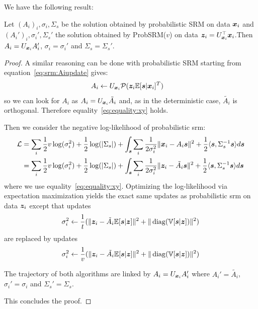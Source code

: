 We have the following result:
\begin{prop}
  Let $(A_i)_i, \sigma_i, \Sigma_s$ be the solution obtained by probabilistic SRM on data
  $\boldsymbol{x}_i$ and $(A_i')_i, \sigma_i', \Sigma_s'$ the solution obtained by ProbSRM($v$) on
  data $\boldsymbol{z}_i = U_{\boldsymbol{x}_i}^{\top} \boldsymbol{x}_i$.Then $A_i = U_{\boldsymbol{x}_i}A_i'$, $\sigma_i =
  \sigma_i'$ and $\Sigma_s = \Sigma_s'$. 
  \label{prop:optimalprobsrm}
\end{prop}
\begin{proof}
  A similar reasoning can be done with probabilistic SRM starting from
  equation~\eqref{eq:srm:Aiupdate} gives:
  \begin{align}
    A_i &\leftarrow U_{\boldsymbol{x}_i}\mathcal{P}(\boldsymbol{z}_i \mathbb{E}[\boldsymbol{s}| \boldsymbol{x}_i]^T)
  \end{align}
  so we can look for $A_i$ as $A_i = U_{\boldsymbol{x}_i} \tilde{A_i}$ and, as in the
  deterministic case, $\tilde{A_i}$ is orthogonal.
  Therefore equality~\eqref{eq:equality:xy} holds.
  
  Then we consider the negative log-likelihood of probabilistic srm:
  \begin{align}
    \mathcal{L} &= \sum_i \frac12 v\log(\sigma_i^2) + \frac12 \log(|\Sigma_s|) + \int_{\boldsymbol{s}} \sum_i \frac1{2 \sigma_i^{2}}\|\boldsymbol{x}_i - A_i \boldsymbol{s} \|^2 + \frac12 \langle \boldsymbol{s} , \Sigma_s^{-1} \boldsymbol{s} \rangle  d\boldsymbol{s} \\
    &= \sum_i \frac12 v \log(\sigma_i^2) + \frac12 \log(|\Sigma_s|) + \int_{\boldsymbol{s}} \sum_i \frac1{2 \sigma_i^{2}}\|\boldsymbol{z}_i - \tilde{A_i} \boldsymbol{s} \|^2 + \frac12 \langle \boldsymbol{s} , \Sigma_s^{-1} \boldsymbol{s} \rangle  d\boldsymbol{s}
  \end{align}
  where we use equality~\eqref{eq:equality:xy}.
  Optimizing the log-likelihood via expectation maximization yields the exact
  same updates as probabilistic srm on data $\boldsymbol{z}_i$
  except that updates
  \begin{align}
    \sigma_i^2 \leftarrow \frac1{t} (\| \boldsymbol{z}_i - \tilde{A_i} \mathbb{E}[\boldsymbol{s}|\boldsymbol{z}]\|^2 + \| \operatorname*{diag}(\mathbb{V}[\boldsymbol{s} | \boldsymbol{z}]) \|^2)
  \end{align}
  are replaced by updates
  \begin{align}
    \sigma_i^2 \leftarrow \frac1{v} (\| \boldsymbol{z}_i - \tilde{A_i} \mathbb{E}[\boldsymbol{s}|\boldsymbol{z}]\|^2 + \| \operatorname*{diag}(\mathbb{V}[\boldsymbol{s} | \boldsymbol{z}]) \|^2)
  \end{align}

  The trajectory of both algorithms are linked by $A_i = U_{\boldsymbol{x}_i}A_i'$ where
  $A_i' = \tilde{A_i}$, $\sigma_i' =
  \sigma_i$ and $\Sigma_s'  = \Sigma_s$.

  This concludes the proof.
\end{proof}

